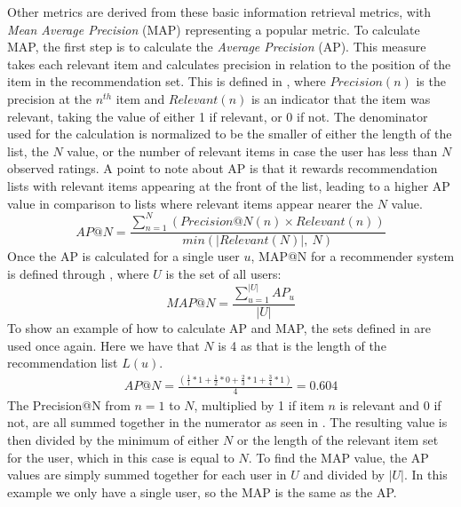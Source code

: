Other metrics are derived from these basic information retrieval metrics, with \textit{Mean Average Precision} (MAP) representing a popular metric\cite{ChoosingMetricsEvaluation}.
To calculate MAP, the first step is to calculate the \textit{Average Precision} (AP).
This measure takes each relevant item and calculates precision in relation to the position of the item in the recommendation set.
This is defined in , where $Precision(n)$ is the precision at the $n^{th}$ item and $Relevant(n)$ is an indicator that the item was relevant, taking the value of either 1 if relevant, or 0 if not.
The denominator used for the calculation is normalized to be the smaller of either the length of the list, the $N$ value, or the number of relevant items in case the user has less than $N$ observed ratings.
A point to note about AP is that it rewards recommendation lists with relevant items appearing at the front of the list, leading to a higher AP value in comparison to lists where relevant items appear nearer the $N$ value. 
\begin{equation}
    \label{eq:averageprecision}
    AP@N = \frac{\sum\limits_{n=1}^N (Precision@N(n) \times Relevant(n))}{min(|Relevant(N)|,\:N)}
\end{equation}
Once the AP is calculated for a single user $u$, MAP@N for a recommender system is defined through , where $U$ is the set of all users: 
\begin{equation}
    \label{eq:map}
    MAP@N = \frac{\sum\limits_{u=1}^{|U|} AP_u}{|U|}
\end{equation}
To show an example of how to calculate AP and MAP, the sets defined in  are used once again.
Here we have that $N$ is 4 as that is the length of the recommendation list $L(u)$.
\begin{align}
    AP@N = \frac{(\frac{1}{1}*1+\frac{1}{2}*0+\frac{2}{3}*1+\frac{3}{4}*1)}{4} = 0.604 \label{eqn:ap-example}
\end{align}
The Precision@N from $n=1$ to $N$, multiplied by 1 if item $n$ is relevant and 0 if not, are all summed together in the numerator as seen in .
The resulting value is then divided by the minimum of either $N$ or the length of the relevant item set for the user, which in this case is equal to $N$.
To find the MAP value, the AP values are simply summed together for each user in $U$ and divided by $|U|$.
In this example we only have a single user, so the MAP is the same as the AP.
\\\\
